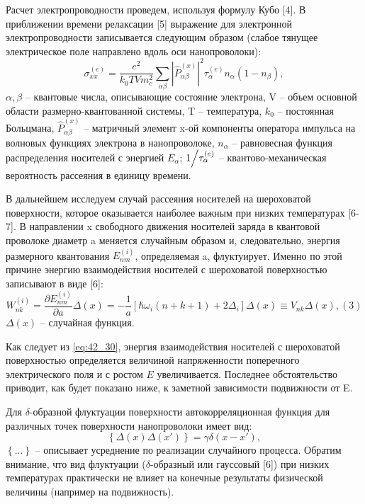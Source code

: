 Расчет электропроводности проведем, используя формулу Кубо [4]. В приближении времени релаксации [5] выражение для электронной электропроводности записывается следующим образом (слабое тянущее электрическое поле направлено вдоль оси нанопроволоки):
\begin{equation} \label{eq:42_20}
\sigma _{xx}^{(e)} =\frac{e^{2} }{k_{0} TVm_{c}^{2} } \sum _{\alpha \beta }\left|\hat{P}_{\alpha \beta }^{(x)} \right|^{2} \tau _{\alpha }^{(e)} n_{\alpha } \left(1-n_{\beta } \right),
\end{equation} 
$\alpha ,\beta $ -- квантовые числа, описывающие состояние электрона, V -- объем основной области размерно-квантованной системы, T -- температура, $k_{0} $ -- постоянная Больцмана, $\hat{P}_{\alpha \beta }^{(x)} $ -- матричный элемент x-ой компоненты оператора импульса на волновых функциях электрона в нанопроволоке, $n_{\alpha } $ -- равновесная функция распределения носителей с энергией $E_{\alpha } $; ${1 \mathord{\left/{\vphantom{1 \tau _{\alpha }^{(e)} }}\right.\kern-\nulldelimiterspace} \tau _{\alpha }^{(e)} } $ -- квантово-механическая вероятность рассеяния в единицу времени.

В дальнейшем исследуем случай рассеяния носителей на шероховатой поверхности, которое оказывается наиболее важным при низких температурах [6-7]. В направлении x свободного движения носителей заряда в квантовой проволоке диаметр a меняется случайным образом и, следовательно, энергия размерного квантования $E_{nm}^{(i)} $, определяемая a, флуктуирует. Именно по этой причине энергию взаимодействия носителей с шероховатой поверхностью записывают в виде [6]:
\begin{equation} \label{eq:42_30}
W_{nk}^{(i)} =\frac{\partial E_{nm}^{(i)} }{\partial a} \Delta (x)=-\frac{1}{a} \left[\hbar \omega _{i} \left(n+k+1\right)+2\Delta _{i} \right]\Delta (x)\equiv V_{nk} \Delta (x),  (3)
\end{equation}  
$\Delta (x)$ -- случайная функция.

Как следует из \eqref{eq:42_30}, энергия взаимодействия носителей с шероховатой поверхностью определяется величиной напряженности поперечного электрического поля и с ростом $E$ увеличивается. Последнее обстоятельство приводит, как будет показано ниже, к заметной зависимости подвижности от E.

Для $\delta $-образной флуктуации поверхности автокорреляционная функция для различных точек поверхности нанопроволоки имеет вид:
\begin{equation} \label{eq:42_40}
\left\{\Delta (x)\Delta (x')\right\}=\gamma \delta (x-x'),
\end{equation} 
$\left\{...\right\}$ -- описывает усреднение по реализации случайного процесса. Обратим внимание, что вид флуктуации ($\delta $-образный или гауссовый [6]) при низких температурах практически не влияет на конечные результаты физической величины (например на подвижность).

